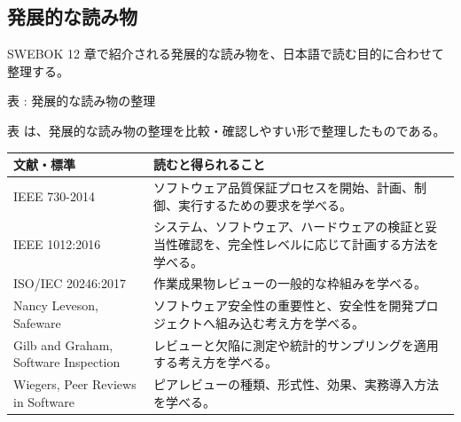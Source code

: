 \subsection{発展的な読み物}
SWEBOK 12 章で紹介される発展的な読み物を、日本語で読む目的に合わせて整理する。


\noindent\par\smallskip\noindent{}\label{tab:ch12-07}表 \thetable: 発展的な読み物の整理\par\smallskip
表 \thetable は、発展的な読み物の整理を比較・確認しやすい形で整理したものである。\par\smallskip
\begin{tabularx}{\textwidth}{L{0.35\textwidth}Y}
\toprule
文献・標準 & 読むと得られること \\
\midrule
IEEE 730-2014 & ソフトウェア品質保証プロセスを開始、計画、制御、実行するための要求を学べる。 \\
IEEE 1012:2016 & システム、ソフトウェア、ハードウェアの検証と妥当性確認を、完全性レベルに応じて計画する方法を学べる。 \\
ISO/IEC 20246:2017 & 作業成果物レビューの一般的な枠組みを学べる。 \\
Nancy Leveson, Safeware & ソフトウェア安全性の重要性と、安全性を開発プロジェクトへ組み込む考え方を学べる。 \\
Gilb and Graham, Software Inspection & レビューと欠陥に測定や統計的サンプリングを適用する考え方を学べる。 \\
Wiegers, Peer Reviews in Software & ピアレビューの種類、形式性、効果、実務導入方法を学べる。 \\
\bottomrule
\end{tabularx}
